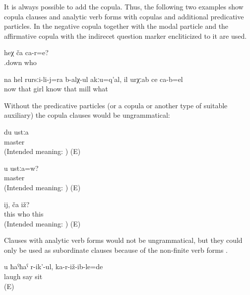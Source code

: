 It is always possible to add the copula. Thus, the following two examples show copula clauses and analytic verb forms with copulas and additional predicative particles. In  the negative copula together with the modal particle and the affirmative copula with the indirecet question marker encliticized to it are used.
%
\begin{exe}
	\ex	\label{ex:Who is she minor}
	\gll	heχ	ča 	ca-r=e?\\
		.down	who	\\
	\glt	{}

	\ex	\label{ex:na hel rursilijra balxul akuqal il urxab ce cabel minor}
	\gll	na	hel	rursːi-li-j=ra	b-alχ-ul akːu=q'al,	il	urχːab	ce	ca-b=el\\
		now	that	girl	know		that	mill	what	\\
	\glt	{}
\end{exe}

Without the predicative particles (or a copula or another type of suitable auxiliary) the copula clauses would be ungrammatical:
%
\begin{exe}
	\ex	\label{ex:I am a master ungrammatical minor}
	\gll	{*}	du	ustːa\\
		{}		master\\
	\glt	(Intended meaning: ) (E)

	\ex	\label{ex:Are you a master ungrammatical minor}
	\gll	{*}	u	ustːa=w?\\
		{}		master\\
	\glt	(Intended meaning: ) (E)

	\ex	\label{ex:This, who is it ungrammatical minor}
	\gll	{*}	ij,	ča	iž?\\
		{}	this	who	this\\
	\glt	(Intended meaning: ) (E)
\end{exe}

Clauses with analytic verb forms would not be ungrammatical, but they could only be used as subordinate clauses because of the non-finite verb forms .
%
\begin{exe}
	\ex	\label{ex:You sit and are laughing minor}
	\gll	u	ħaˁħaˁ	r-ik'-ul,	ka-r-iž-ib-le=de\\
			laugh	say	sit\\
	\glt	{} (E)
\end{exe}


